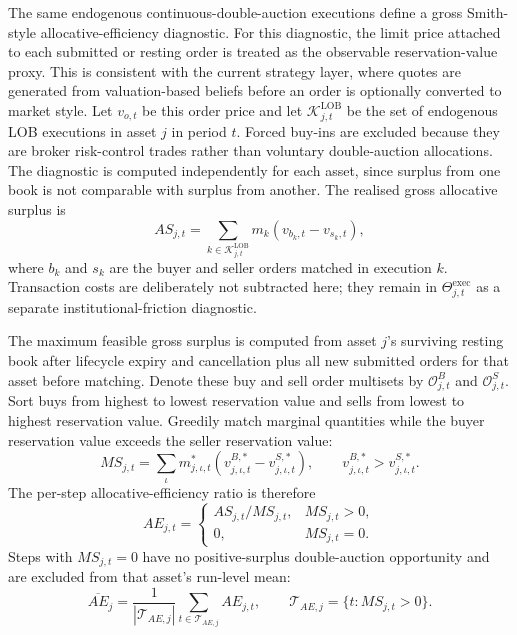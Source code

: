 \documentclass[12pt, a4paper]{article}
\begin{document}
    The same endogenous continuous-double-auction executions define a gross
    Smith-style allocative-efficiency diagnostic. For this diagnostic, the limit
    price attached to each submitted or resting order is treated as the observable
    reservation-value proxy. This is consistent with the current strategy layer,
    where quotes are generated from valuation-based beliefs before an order is
    optionally converted to market style. Let \(v_{o,t}\) be this order price and
    let \(\mathcal{K}_{j,t}^{\mathrm{LOB}}\) be the set of endogenous LOB
    executions in asset \(j\) in period \(t\). Forced buy-ins are excluded because
    they are broker risk-control trades rather than voluntary double-auction
    allocations. The diagnostic is computed independently for each asset, since
    surplus from one book is not comparable with surplus from another. The
    realised gross allocative surplus is
    \[
        AS_{j,t}
        =
        \sum_{k\in\mathcal{K}_{j,t}^{\mathrm{LOB}}}
        m_k\left(v_{b_k,t}-v_{s_k,t}\right),
    \]
    where \(b_k\) and \(s_k\) are the buyer and seller orders matched in
    execution \(k\). Transaction costs are deliberately not subtracted here; they
    remain in \(\Theta_{j,t}^{\mathrm{exec}}\) as a separate institutional-friction
    diagnostic.

    The maximum feasible gross surplus is computed from asset \(j\)'s surviving
    resting book after lifecycle expiry and cancellation plus all new submitted
    orders for that asset before matching. Denote these buy and sell order
    multisets by \(\mathcal{O}_{j,t}^B\) and \(\mathcal{O}_{j,t}^S\). Sort buys
    from highest to lowest reservation value and sells from lowest to highest
    reservation value. Greedily match marginal quantities while the buyer
    reservation value exceeds the seller reservation value:
    \[
        MS_{j,t}
        =
        \sum_{\iota}
        m_{j,\iota,t}^{\ast}
        \left(v_{j,\iota,t}^{B,\ast}-v_{j,\iota,t}^{S,\ast}\right),
        \qquad
        v_{j,\iota,t}^{B,\ast}>v_{j,\iota,t}^{S,\ast}.
    \]
    The per-step allocative-efficiency ratio is therefore
    \[
        AE_{j,t}=
        \begin{cases}
            AS_{j,t}/MS_{j,t}, & MS_{j,t}>0,\\
            0, & MS_{j,t}=0.
        \end{cases}
    \]
    Steps with \(MS_{j,t}=0\) have no positive-surplus double-auction opportunity
    and are excluded from that asset's run-level mean:
    \[
        \overline{AE}_j
        =
        \frac{1}{|\mathcal{T}_{AE,j}|}
        \sum_{t\in\mathcal{T}_{AE,j}} AE_{j,t},
        \qquad
        \mathcal{T}_{AE,j}=\{t:MS_{j,t}>0\}.
    \]
\end{document}
